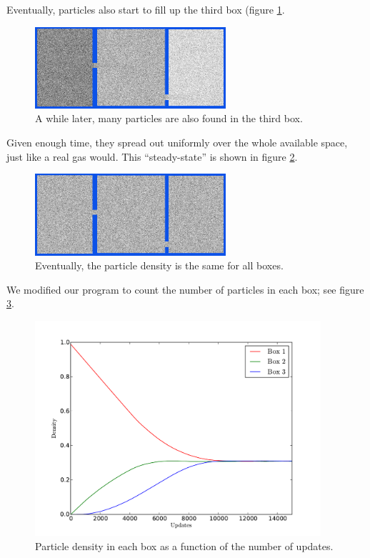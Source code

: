 \documentclass[12pt,a4paper]{article}
\begin{document}
Eventually, particles also start to fill up the third box (figure \ref{diffusionbox3fill}.
\begin{figure}[htp]
\centering
  \includegraphics[width=200pt]{figs/diffusionbox3fill.png}
\caption{A while later, many particles are also found in the third box.}
\label{diffusionbox3fill}
\end{figure}

Given enough time, they spread out uniformly over the whole available space, just like a real gas would.
This ``steady-state'' is shown in figure \ref{diffusionend}.
\begin{figure}[htp]
\centering
  \includegraphics[width=200pt]{figs/diffusionend.png}
\caption{Eventually, the particle density is the same for all boxes.}
\label{diffusionend}
\end{figure}

We modified our program to count the number of particles in each box; see figure \ref{gascount}.
\begin{figure}[htp]
\centering
  \includegraphics[width=300pt]{figs/gascount.pdf}
\caption{Particle density in each box as a function of the number of updates.}
\label{gascount}
\end{figure}
\end{document}
